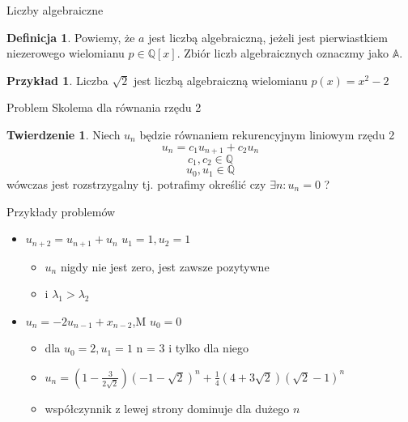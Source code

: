 \documentclass[handout]{beamer}
\def\Q{\mathbb{Q}}
\theoremstyle{definition}
\newtheorem*{definicja}{Definicja}
\newtheorem*{twierdzenie}{Twierdzenie}
\newtheorem*{przyklad}{Przykład}
\theoremstyle{named}
\begin{document}
\begin{frame}{Liczby algebraiczne}
\begin{definicja}
    Powiemy, że $a $ jest liczbą algebraiczną, jeżeli jest pierwiastkiem niezerowego wielomianu $p \in \Q[x]$. Zbiór liczb algebraicznych oznaczmy jako $\mathbb{A}$.
\end{definicja}

\begin{przyklad}
    Liczba $\sqrt{2}$ jest liczbą algebraiczną wielomianu $p(x) = x^{2} - 2$
\end{przyklad}

\end{frame}


\begin{frame}{Problem Skolema dla równania rzędu 2}


\begin{twierdzenie}
    Niech $u_n$ będzie równaniem rekurencyjnym liniowym rzędu 2
    $$
        u_n = c_1 u_{n+1} + c_2 u_n
    $$
    $$
        c_1, c_2 \in \mathbb{Q}
    $$
    $$
        u_0, u_1 \in \mathbb{Q}
    $$
    wówczas jest rozstrzygalny tj. potrafimy określić czy $\exists n : u_n = 0$ ?
\end{twierdzenie}

\end{frame}

\begin{frame}{Przykłady problemów}
\begin{itemize}
    \item $u_{n+2} = u_{n+1} + u_{n}$ $u_{1} = 1, u_{2} = 1$
    \pause
    \begin{itemize}
        \item $u_{n}$ nigdy nie jest zero, jest zawsze pozytywne
        \pause
        \item i $\lambda_1 > \lambda_2$        
    \end{itemize}

    \pause
    \item $u_{n} = -2 u_{n-1} + x_{n-2}$,M $u_{0} = 0$
    \begin{itemize}
          \item dla $u_{0} = 2, u_{1} = 1$ n = 3 i tylko dla niego
        \pause 
        \item $ u_n = (1-\frac{3}{2\sqrt{2}})(-1- \sqrt{2})^n + \frac{1}{4}(4+3\sqrt{2})(\sqrt{2} - 1)^n $
            \pause 
    \item współczynnik z lewej strony dominuje dla dużego $n$
    \end{itemize}
  
    

\end{itemize}
    
\end{frame}
\end{document}

